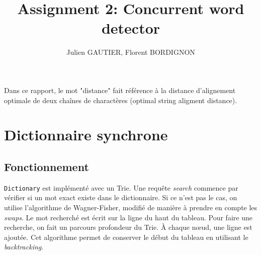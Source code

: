 \documentclass{article}
\title{Assignment 2: Concurrent word detector}
\author{Julien GAUTIER, Florent BORDIGNON}
\begin{document}
\maketitle
Dans ce rapport, le mot "distance" fait référence à la distance
d'alignement optimale de deux chaînes de charactères (optimal string
aligment distance).

\section{Dictionnaire synchrone}
\subsection{Fonctionnement}
\texttt{Dictionary} est implémenté avec un Trie.
Une requête \textit{search} commence par vérifier si un mot exact existe
dans le dictionnaire.
Si ce n'est pas le cas, on utilise l'algorithme de Wagner-Fisher,
modifié de manière à prendre en compte les \textit{swaps}.
Le mot recherché est écrit sur la ligne du haut du tableau.
Pour faire une recherche, on fait un parcours profondeur du Trie.
À chaque n\oe{}ud, une ligne est ajoutée.
Cet algorithme permet de conserver le début du tableau en utilisant le
\textit{backtracking}.\\


\end{document}
